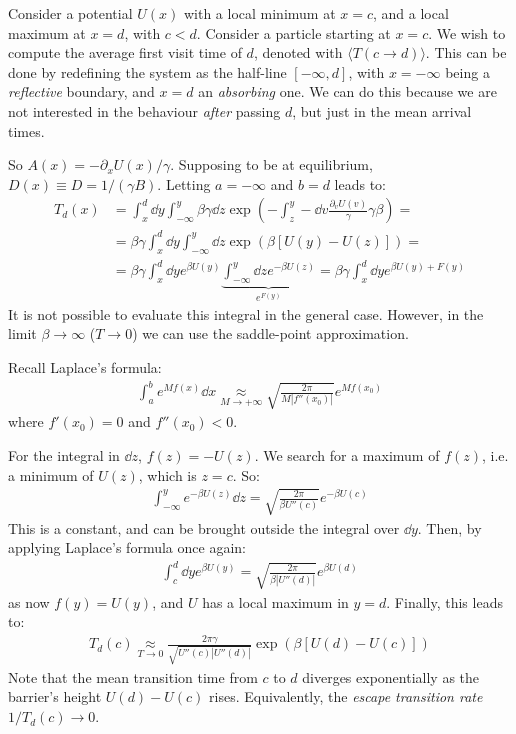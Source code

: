\documentclass[../template.tex]{subfiles}
\begin{document}
Consider a potential $U(x)$ with a local minimum at $x=c$, and a local maximum at $x=d$, with $c < d$. Consider a particle starting at $x=c$. We wish to compute the average first visit time of $d$, denoted with $\langle T(c \to d) \rangle$. 
This can be done by redefining the system as the half-line $[-\infty,d]$, with $x=-\infty$ being a \textit{reflective} boundary, and $x=d$ an \textit{absorbing} one. We can do this because we are not interested in the behaviour \textit{after} passing $d$, but just in the mean arrival times.

So $A(x) = - \partial_x U(x)/\gamma$. Supposing to be at equilibrium, $D(x) \equiv D = 1/(\gamma B)$. Letting $a=-\infty$ and $b=d$ leads to:
\begin{align*}
    T_d(x) &= \int_x^d \dd{y} \int_{-\infty}^y \beta \gamma \dd{z} \exp\left(-\int_z^y -\dd{v}\frac{\partial_v U(v)}{\gamma} \gamma \beta \right) =\\
    &= \beta \gamma \int_x^d \dd{y} \int_{-\infty}^{y} \dd{z} \exp(\beta [U(y) - U(z)]) =\\
    &= \beta \gamma \int_x^d \dd{y} e^{\beta U(y)} \underbrace{\int_{-\infty}^{y} \dd{z} e^{- \beta U(z)}}_{e^{F(y)}}  = \beta \gamma \int_x^{d} \dd{y} e^{\beta U(y) + F(y)}
\end{align*}
It is not possible to evaluate this integral in the general case. However, in the limit $\beta \to \infty$ ($T \to 0$) we can use the saddle-point approximation. 

Recall Laplace's formula:
\begin{align*}
    \int_a^b e^{M f(x)} \dd{x} \underset{M \to +\infty}{\approx}  \sqrt{\frac{2 \pi}{M|f''(x_0)|} } e^{Mf(x_0)}
\end{align*}
where $f'(x_0) = 0$ and $f''(x_0) < 0$.

For the integral in $\dd{z}$, $f(z) = -U(z)$. We search for a maximum of $f(z)$, i.e. a minimum of $U(z)$, which is $z=c$. So:
\begin{align*}
    \int_{-\infty}^y e^{- \beta U(z) }\dd{z} = \sqrt{\frac{2 \pi}{\beta U''(c)}} e^{-\beta U(c)}  
\end{align*}
This is a constant, and can be brought outside the integral over $\dd{y}$. Then, by applying Laplace's formula once again:
\begin{align*}
    \int_c^d \dd{y} e^{\beta U(y)} = \sqrt{\frac{2 \pi}{\beta |U''(d)|} } e^{\beta U(d)}
\end{align*}
as now $f(y) = U(y)$, and $U$ has a local maximum in $y = d$. Finally, this leads to:
\begin{align*}
    T_d(c) \underset{T \to 0}{\approx}  \frac{2 \pi \gamma}{\sqrt{U''(c) |U''(d)|}}  \exp\left(\beta[U(d) - U(c)]\right)
\end{align*}
Note that the mean transition time from $c$ to $d$ diverges exponentially as the barrier's height $U(d) - U(c)$ rises. Equivalently, the \textit{escape transition rate} $1/T_d(c) \to 0$.
\end{document}
